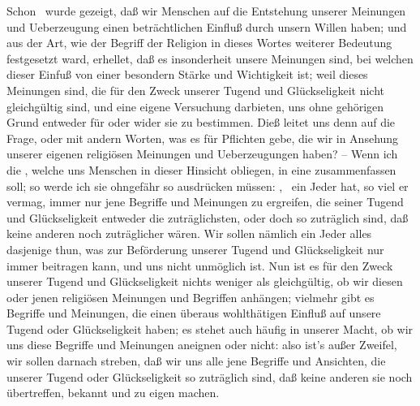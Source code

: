 Schon \ wurde gezeigt, daß wir Menschen auf die Entstehung unserer Meinungen und Ueberzeugung einen beträchtlichen Einfluß durch unsern Willen haben; und aus der Art, wie der Begriff der Religion in dieses Wortes weiterer Bedeutung festgesetzt ward, erhellet, daß es insonderheit unsere  Meinungen sind, bei welchen dieser Einfuß von einer besondern Stärke und Wichtigkeit ist; weil dieses Meinungen sind, die für den Zweck unserer Tugend und Glückseligkeit nicht gleichgültig sind, und eine eigene Versuchung darbieten, uns ohne gehörigen Grund entweder für oder wider sie zu bestimmen. Dieß leitet uns denn auf die Frage,  oder mit andern Worten, was es für Pflichten gebe, die wir in Ansehung unserer eigenen religiösen Meinungen und Ueberzeugungen haben? -- Wenn ich die , welche uns Menschen in dieser Hinsicht obliegen,  in eine  zusammenfassen soll; so werde ich sie ohngefähr so ausdrücken müssen: , \dh\ ein Jeder hat, so viel er vermag, immer nur jene Begriffe und Meinungen zu ergreifen, die seiner Tugend und Glückseligkeit entweder die zuträglichsten, oder doch so zuträglich sind, daß keine anderen noch zuträglicher wären. Wir sollen nämlich ein Jeder alles dasjenige thun, was zur Beförderung unserer Tugend und Glückseligkeit nur immer beitragen kann, und uns nicht unmöglich ist. Nun ist es für den Zweck unserer Tugend und Glückseligkeit nichts weniger als gleichgültig, ob wir diesen oder jenen religiösen Meinungen und Begriffen anhängen; vielmehr gibt es Begriffe und Meinungen, die einen überaus wohlthätigen Einfluß auf unsere Tugend oder Glückseligkeit haben; es stehet auch häufig in unserer Macht, ob wir uns diese Begriffe und Meinungen aneignen oder nicht: also ist's außer Zweifel, wir sollen darnach streben, daß wir uns alle jene Begriffe und Ansichten, die unserer Tugend oder Glückseligkeit so zuträglich sind, daß keine anderen sie noch übertreffen, bekannt und zu eigen machen.

